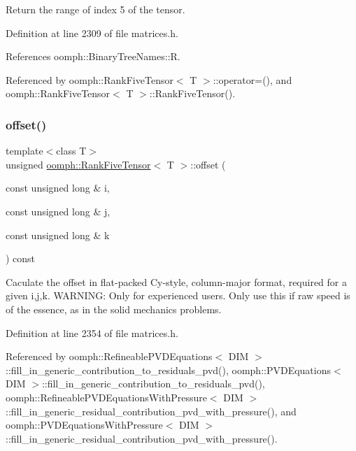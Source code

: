 Return the range of index 5 of the tensor. 



Definition at line 2309 of file matrices.\+h.



References oomph\+::\+Binary\+Tree\+Names\+::R.



Referenced by oomph\+::\+Rank\+Five\+Tensor$<$ T $>$\+::operator=(), and oomph\+::\+Rank\+Five\+Tensor$<$ T $>$\+::\+Rank\+Five\+Tensor().

\mbox{\label{classoomph_1_1RankFiveTensor_ab3bd11afa49e36ff28c1d4968796f5a3}} 
\subsubsection{\texorpdfstring{offset()}{offset()}}
{\footnotesize\ttfamily template$<$class T$>$ \\
unsigned \hyperlink{classoomph_1_1RankFiveTensor}{oomph\+::\+Rank\+Five\+Tensor}$<$ T $>$\+::offset (\begin{DoxyParamCaption}\item[{const unsigned long \&}]{i,  }\item[{const unsigned long \&}]{j,  }\item[{const unsigned long \&}]{k }\end{DoxyParamCaption}) const\hspace{0.3cm}{\ttfamily [inline]}}



Caculate the offset in flat-\/packed Cy-\/style, column-\/major format, required for a given i,j,k. W\+A\+R\+N\+I\+NG\+: Only for experienced users. Only use this if raw speed is of the essence, as in the solid mechanics problems. 



Definition at line 2354 of file matrices.\+h.



Referenced by oomph\+::\+Refineable\+P\+V\+D\+Equations$<$ D\+I\+M $>$\+::fill\+\_\+in\+\_\+generic\+\_\+contribution\+\_\+to\+\_\+residuals\+\_\+pvd(), oomph\+::\+P\+V\+D\+Equations$<$ D\+I\+M $>$\+::fill\+\_\+in\+\_\+generic\+\_\+contribution\+\_\+to\+\_\+residuals\+\_\+pvd(), oomph\+::\+Refineable\+P\+V\+D\+Equations\+With\+Pressure$<$ D\+I\+M $>$\+::fill\+\_\+in\+\_\+generic\+\_\+residual\+\_\+contribution\+\_\+pvd\+\_\+with\+\_\+pressure(), and oomph\+::\+P\+V\+D\+Equations\+With\+Pressure$<$ D\+I\+M $>$\+::fill\+\_\+in\+\_\+generic\+\_\+residual\+\_\+contribution\+\_\+pvd\+\_\+with\+\_\+pressure().


